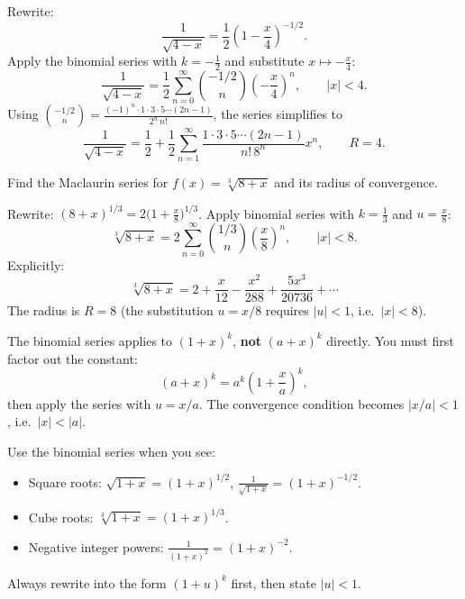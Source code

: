 \begin{examplebox}[title={Worked Example: binomial series for $1/\sqrt{4-x}$ (Lecture Ex.~6.18)}]
Rewrite:
\[
\frac{1}{\sqrt{4-x}}=\frac{1}{2}\left(1-\frac{x}{4}\right)^{-1/2}.
\]
Apply the binomial series with $k=-\frac12$ and substitute $x\mapsto -\frac{x}{4}$:
\[
\frac{1}{\sqrt{4-x}}
=\frac{1}{2}\sum_{n=0}^{\infty}\binom{-1/2}{n}\left(-\frac{x}{4}\right)^n,
\qquad |x|<4.
\]
Using $\binom{-1/2}{n}=\frac{(-1)^n\cdot 1\cdot 3\cdot 5\cdots(2n-1)}{2^n\,n!}$, the series simplifies to
\[
\frac{1}{\sqrt{4-x}}=\frac{1}{2}+\frac{1}{2}\sum_{n=1}^{\infty}\frac{1\cdot 3\cdot 5\cdots(2n-1)}{n!\,8^n}x^n,
\qquad R=4.
\]
\end{examplebox}

\begin{examplebox}[title={Worked Example: cube root (Tutorial~12, Q5)}]
Find the Maclaurin series for $f(x)=\sqrt[3]{8+x}$ and its radius of convergence.

\smallskip
Rewrite: $(8+x)^{1/3}=2\bigl(1+\frac{x}{8}\bigr)^{1/3}$.
Apply binomial series with $k=\frac13$ and $u=\frac{x}{8}$:
\[
\sqrt[3]{8+x}=2\sum_{n=0}^{\infty}\binom{1/3}{n}\left(\frac{x}{8}\right)^n,
\qquad |x|<8.
\]
Explicitly:
\[
\sqrt[3]{8+x}=2+\frac{x}{12}-\frac{x^2}{288}+\frac{5x^3}{20736}+\cdots
\]
The radius is $R=8$ (the substitution $u=x/8$ requires $|u|<1$, i.e.\ $|x|<8$).
\end{examplebox}

\begin{commonmistake}[title={Common Mistake: wrong form for binomial series}]
The binomial series applies to $(1+x)^k$, \textbf{not} $(a+x)^k$ directly.
You must first factor out the constant:
\[
(a+x)^k = a^k\left(1+\frac{x}{a}\right)^k,
\]
then apply the series with $u=x/a$. The convergence condition becomes $|x/a|<1$, i.e.\ $|x|<|a|$.
\end{commonmistake}

\begin{examtip}[title={Exam Focus: when to use the binomial series}]
Use the binomial series when you see:
\begin{itemize}[leftmargin=*]
\item Square roots: $\sqrt{1+x}=(1+x)^{1/2}$, $\frac{1}{\sqrt{1+x}}=(1+x)^{-1/2}$.
\item Cube roots: $\sqrt[3]{1+x}=(1+x)^{1/3}$.
\item Negative integer powers: $\frac{1}{(1+x)^2}=(1+x)^{-2}$.
\end{itemize}
Always rewrite into the form $(1+u)^k$ first, then state $|u|<1$.
\end{examtip}

